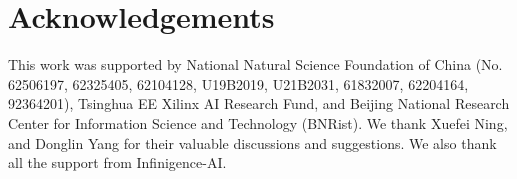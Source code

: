 \section*{Acknowledgements}

This work was supported by National Natural Science Foundation of China (No. 62506197, 62325405, 62104128, U19B2019, U21B2031, 61832007, 62204164, 92364201), Tsinghua EE Xilinx AI Research Fund, and Beijing National Research Center for Information Science and Technology (BNRist).
We thank Xuefei Ning, and Donglin Yang for their valuable discussions and suggestions.
We also thank all the support from Infinigence-AI.